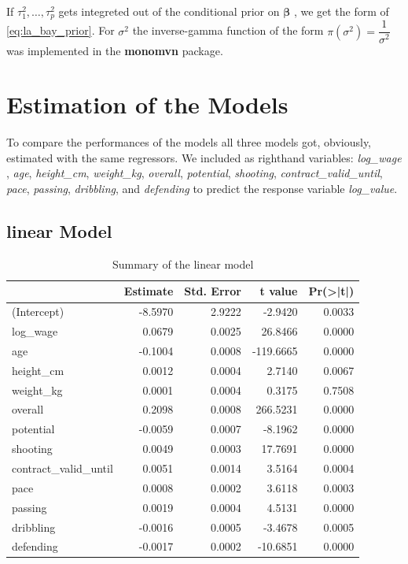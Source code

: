 \documentclass[12pt,a4paper]{article}
\begin{document}
If \(\tau^2_1 , \ldots , \tau^2_p\) gets integreted out of the
conditional prior on \(\pmb{\beta}\) , we get the form of
\eqref{eq:la_bay_prior}. For \(\sigma^2\) the inverse-gamma function of
the form \(\pi \left( \sigma^2 \right) = \dfrac{1}{\sigma^2}\) was
implemented in the \textbf{monomvn} package.

\hypertarget{estimation-of-the-models}{%
\section{Estimation of the Models}\label{estimation-of-the-models}}

To compare the performances of the models all three models got,
obviously, estimated with the same regressors. We included as righthand
variables: \emph{log\_wage} , \emph{age}, \emph{height\_cm},
\emph{weight\_kg}, \emph{overall}, \emph{potential}, \emph{shooting},
\emph{contract\_valid\_until}, \emph{pace}, \emph{passing},
\emph{dribbling}, and \emph{defending} to predict the response variable
\emph{log\_value}.

\hypertarget{linear-model-1}{%
\subsection{linear Model}\label{linear-model-1}}

\FloatBarrier
\begin{table}[!h]

\caption{\label{tab:structure and lm}\label{tab:sum_lm} Summary of the linear model}
\centering
\begin{tabular}[t]{lrrrr}
\toprule
  & Estimate & Std. Error & t value & Pr(>|t|)\\
\midrule
\rowcolor{gray!6}  (Intercept) & -8.5970 & 2.9222 & -2.9420 & 0.0033\\
log\_wage & 0.0679 & 0.0025 & 26.8466 & 0.0000\\
\rowcolor{gray!6}  age & -0.1004 & 0.0008 & -119.6665 & 0.0000\\
height\_cm & 0.0012 & 0.0004 & 2.7140 & 0.0067\\
\rowcolor{gray!6}  weight\_kg & 0.0001 & 0.0004 & 0.3175 & 0.7508\\
overall & 0.2098 & 0.0008 & 266.5231 & 0.0000\\
\rowcolor{gray!6}  potential & -0.0059 & 0.0007 & -8.1962 & 0.0000\\
shooting & 0.0049 & 0.0003 & 17.7691 & 0.0000\\
\rowcolor{gray!6}  contract\_valid\_until & 0.0051 & 0.0014 & 3.5164 & 0.0004\\
pace & 0.0008 & 0.0002 & 3.6118 & 0.0003\\
\rowcolor{gray!6}  passing & 0.0019 & 0.0004 & 4.5131 & 0.0000\\
dribbling & -0.0016 & 0.0005 & -3.4678 & 0.0005\\
\rowcolor{gray!6}  defending & -0.0017 & 0.0002 & -10.6851 & 0.0000\\
\bottomrule
\end{tabular}
\end{table}
\FloatBarrier
\end{document}
